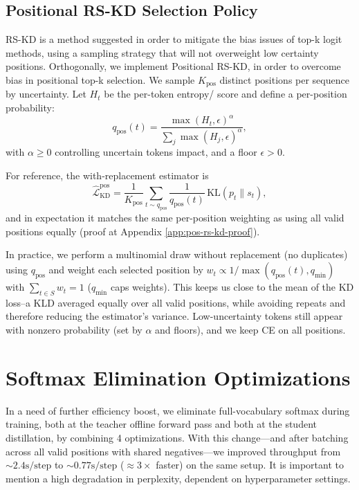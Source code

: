 \documentclass[11pt]{article}
\begin{document}
\subsection{Positional RS-KD Selection Policy}
RS-KD is a method suggested in order to mitigate the bias issues of top-k logit methods, using a sampling strategy that will not overweight low certainty positions. Orthogonally, we implement Positional RS-KD, in order to overcome bias in positional top-k selection. We sample $K_{\text{pos}}$ distinct positions per sequence by uncertainty. Let $H_t$ be the per-token entropy/ score and define a per-position probability:
\[
	q_{\text{pos}}(t)=\frac{\max(H_t,\epsilon)^{\alpha}}{\sum_j \max(H_j,\epsilon)^{\alpha}},
\]
with $\alpha\ge0$ controlling uncertain tokens impact, and a floor $\epsilon>0$.

For reference, the with-replacement estimator is
\[
	\widehat{\mathcal{L}}_{\text{KD}}^{\text{pos}}
	=\frac{1}{K_{\text{pos}}}\sum_{t\sim q_{\text{pos}}}\frac{1}{q_{\text{pos}}(t)}
	\,\mathrm{KL}(p_t\|s_t),
\]
and in expectation it matches the same per-position weighting as using all valid positions equally (proof at Appendix \ref{app:pos-rs-kd-proof}).

In practice, we perform a multinomial draw without replacement (no duplicates) using $q_{\text{pos}}$ and weight each selected position by
$w_t \propto 1/\max(q_{\text{pos}}(t),q_{\min})$ with $\sum_{t\in S} w_t=1$ ($q_{\min}$ caps weights).
This keeps us close to the mean of the KD loss--a KLD averaged equally over all valid positions, while avoiding repeats and therefore reducing the estimator's variance.
Low-uncertainty tokens still appear with nonzero probability (set by $\alpha$ and floors), and we keep CE on all positions.

\section{Softmax Elimination Optimizations}
\label{sec:softmax_elimination}
In a need of further efficiency boost, we eliminate full-vocabulary softmax during training, both at the teacher offline forward pass and both at the student distillation, by combining 4 optimizations.
With this change---and after batching across all valid positions with shared negatives---we improved throughput from ${\sim}2.4\text{s}/\text{step}$ to ${\sim}0.77\text{s}/\text{step}$ ($\approx3\times$ faster) on the same setup.
It is important to mention a high degradation in perplexity, dependent on hyperparameter settings.
\end{document}
